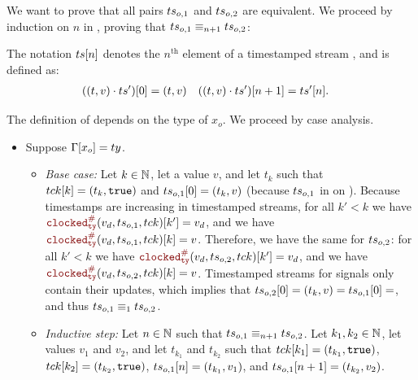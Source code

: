 \begin{skippableproof}
    We want to prove that all pairs $ts_{o, 1}$ and $ts_{o, 2}$ are equivalent. We proceed by
    induction on $n$ in \N, proving that $ts_{o, 1} \equiv_{n+1} ts_{o, 2}$:

    The notation $ts[n]$ denotes the $n^\text{th}$ element of a timestamped stream \ts, and is
    defined as:
    \begin{align}
        ((t, v) \cdot ts')[0] & = (t, v) & ((t, v) \cdot ts')[n+1] & = ts'[n].
        \label{eq:semantics:grfrp:theorems:determinism:get}
    \end{align}

    The definition of  depends on the type of $x_o$. We proceed by case
    analysis.
    \begin{itemize}
        \item Suppose $\Gamma[x_o] = ty$.
              \begin{itemize}
                  \item \textit{Base case:} Let $k \in \mathbb{N}$, let a value $v$, and let $t_k$ such that
                        $tck[k] = (t_k, \mathtt{{true}})$ and $ts_{o, 1}[0] = (t_k, v)$ (because
                        $ts_{o, 1}$ in on \tck). Because timestamps are increasing in timestamped
                        streams, for all $k' < k$ we have $\clocked{ty}{v_d}{\ts_{o, 1}}{\tck}[k'] = v_d$,
                        and we have $\clocked{ty}{v_d}{\ts_{o, 1}}{\tck}[k] = v$.
                        Therefore, we have the same for $ts_{o, 2}$: for all $k' < k$ we have
                        $\clocked{ty}{v_d}{\ts_{o, 2}}{\tck}[k'] = v_d$, and we have
                        $\clocked{ty}{v_d}{\ts_{o, 2}}{\tck}[k] = v$.
                        Timestamped streams for signals only contain their updates, which implies
                        that $ts_{o, 2}[0] = (t_k, v) = ts_{o, 1}[0] = $, and thus
                        $ts_{o, 1} \equiv_1 ts_{o, 2}$.

                  \item \textit{Inductive step:} Let $n \in \mathbb{N}$ such that
                        $ts_{o, 1} \equiv_{n+1} ts_{o, 2}$. Let $k_1, k_2 \in \mathbb{N}$, let values
                        $v_1$ and $v_2$, and let $t_{k_1}$ and $t_{k_2}$ such that
                        $tck[k_1] = (t_{k_1}, \mathtt{{true}})$, $tck[k_2] = (t_{k_2}, \mathtt{{true}})$,
                        $ts_{o, 1}[n] = (t_{k_1}, v_1)$, and $ts_{o, 1}[n+1] = (t_{k_2}, v_2)$.


\end{itemize}
\end{itemize}
\end{skippableproof}
